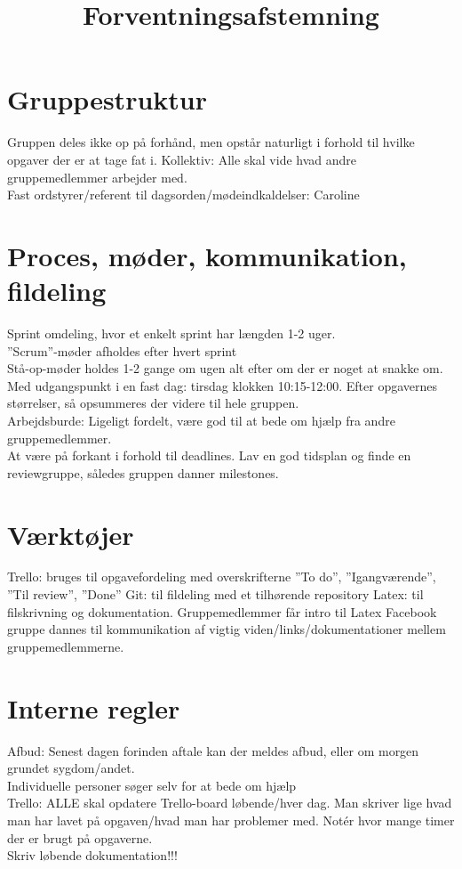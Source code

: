 \documentclass[12pt,a4paper]{article}
\begin{document}
\title{Forventningsafstemning}
\maketitle

\section{Gruppestruktur}
Gruppen deles ikke op på forhånd, men opstår naturligt i forhold til hvilke opgaver der er at tage fat i. Kollektiv: Alle skal vide hvad andre gruppemedlemmer arbejder med. \\
Fast ordstyrer/referent til dagsorden/mødeindkaldelser: Caroline

\section{Proces, møder, kommunikation, fildeling}
Sprint omdeling, hvor et enkelt sprint har længden 1-2 uger. \\
”Scrum”-møder afholdes efter hvert sprint \\
Stå-op-møder holdes 1-2 gange om ugen alt efter om der er noget at snakke om. Med udgangspunkt i en fast dag: tirsdag klokken 10:15-12:00. Efter opgavernes størrelser, så opsummeres der videre til hele gruppen. \\
Arbejdsburde: Ligeligt fordelt, være god til at bede om hjælp fra andre gruppemedlemmer. \\
At være på forkant i forhold til deadlines. Lav en god tidsplan og finde en reviewgruppe, således gruppen danner milestones. \\

\section{Værktøjer}
Trello: bruges til opgavefordeling med overskrifterne ”To do”, ”Igangværende”, ”Til review”, ”Done”
Git: til fildeling med et tilhørende repository  
Latex: til filskrivning og dokumentation. Gruppemedlemmer får intro til Latex
Facebook gruppe dannes til kommunikation af vigtig viden/links/dokumentationer mellem gruppemedlemmerne. 

\section{Interne regler}
Afbud: Senest dagen forinden aftale kan der meldes afbud, eller om morgen grundet sygdom/andet. \\
Individuelle personer søger selv for at bede om hjælp\\
Trello: ALLE skal opdatere Trello-board løbende/hver dag. Man skriver lige hvad man har lavet på opgaven/hvad man har problemer med. Notér hvor mange timer der er brugt på opgaverne. \\
Skriv løbende dokumentation!!!
\end{document}
